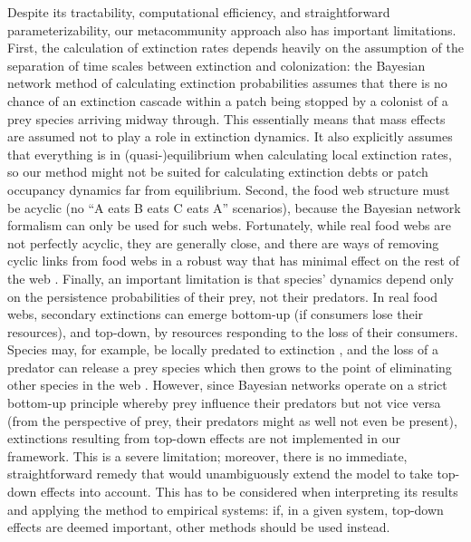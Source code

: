 \documentclass[11pt]{article}
\begin{document}
Despite its tractability, computational efficiency, and straightforward parameterizability, our metacommunity approach also has important limitations. First, the calculation of extinction rates depends heavily on the assumption of the separation of time scales between extinction and colonization: the Bayesian network method of calculating extinction probabilities assumes that there is no chance of an extinction cascade within a patch being stopped by a colonist of a prey species arriving midway through. This essentially means that mass effects are assumed not to play a role in extinction dynamics. It also explicitly assumes that everything is in (quasi-)equilibrium when calculating local extinction rates, so our method might not be suited for calculating extinction debts or patch occupancy dynamics far from equilibrium. Second, the food web structure must be acyclic (no ``A eats B eats C eats A'' scenarios), because the Bayesian network formalism can only be used for such webs. Fortunately, while real food webs are not perfectly acyclic, they are generally close, and there are ways of removing cyclic links from food webs in a robust way that has minimal effect on the rest of the web \citep{Allesinaetal2009, Eklofetal2013MEE}. Finally, an important limitation is that species' dynamics depend only on the persistence probabilities of their prey, not their predators. In real food webs, secondary extinctions can emerge bottom-up (if consumers lose their resources), and top-down, by resources responding to the loss of their consumers. Species may, for example, be locally predated to extinction \citep{Huffaker1958, Schoeneretal2001}, and the loss of a predator can release a prey species which then grows to the point of eliminating other species in the web \citep{Paine1966, Paine1974, LaffertySuchanek2016}. However, since Bayesian networks operate on a strict bottom-up principle whereby prey influence their predators but not vice versa (from the perspective of prey, their predators might as well not even be present), extinctions resulting from top-down effects are not implemented in our framework. This is a severe limitation; moreover, there is no immediate, straightforward remedy that would unambiguously extend the model to take top-down effects into account. This has to be considered when interpreting its results and applying the method to empirical systems: if, in a given system, top-down effects are deemed important, other methods should be used instead.
\end{document}

